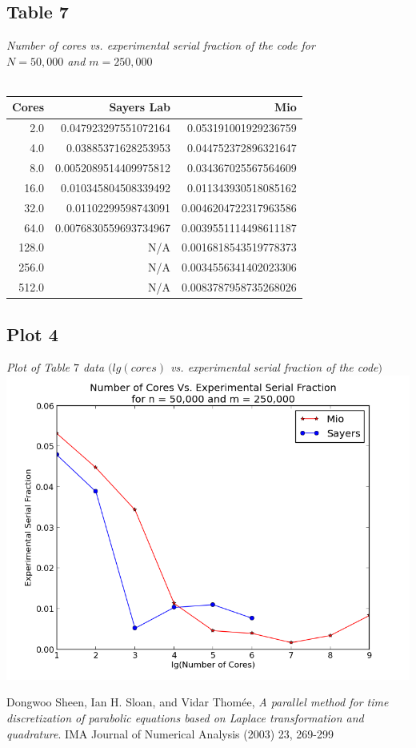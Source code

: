 \documentclass[letterpaper, 12pt]{article}
\begin{document}
	\subsection*{Table 7} \small\textit{Number of cores vs. experimental serial fraction of the code for\\ $N=50,000$ and $m=250,000$} \\\\
	\normalsize
	\begin{tabular}{r||r|r}
	\hline
		Cores              &Sayers Lab                     &Mio \\ 
	\hline
		  2.0    &0.047923297551072164    &0.053191001929236759 \\ 
		  4.0     &0.03885371628253953    &0.044752372896321647 \\ 
		  8.0   &0.0052089514409975812    &0.034367025567564609 \\ 
		 16.0    &0.010345804508339492    &0.011343930518085162 \\ 
		 32.0     &0.01102299598743091   &0.0046204722317963586 \\ 
		 64.0   &0.0076830559693734967   &0.0039551114498611187 \\ 
		128.0                     &N/A   &0.0016818543519778373 \\ 
		256.0                     &N/A   &0.0034556341402023306 \\ 
		512.0                     &N/A   &0.0083787958735268026 \\ 
		\hline
	\end{tabular}
	
	\subsection*{Plot 4} \small\textit{Plot of Table $7$ data $(lg(cores)$ vs. experimental serial fraction of the code$)$} \\
	\normalsize
	\includegraphics[width=.75\linewidth]{ProjectFiles/results/plots/coresVexpserialfrac.png}
	
	\begin{thebibliography}{1}
			Dongwoo Sheen, Ian H. Sloan, and Vidar Thom\'{e}e,
			\emph{A parallel method for time discretization of parabolic equations based on Laplace transformation and quadrature}.
			IMA Journal of Numerical Analysis (2003) 23,
			269-299
			
	\end{thebibliography}
	
\end{document}
